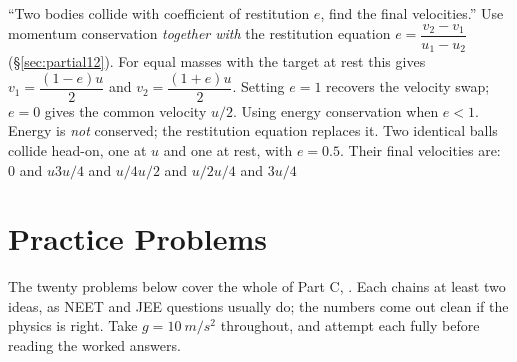 {``Two bodies collide with coefficient of restitution $e$, find the final velocities.''}
{Use momentum conservation \emph{together with} the restitution equation
$e=\dfrac{v_2-v_1}{u_1-u_2}$ (\S\ref{sec:partial12}). For equal masses with the target at rest this gives
$v_1=\dfrac{(1-e)u}{2}$ and $v_2=\dfrac{(1+e)u}{2}$. Setting $e=1$ recovers the velocity swap;
$e=0$ gives the common velocity $u/2$.}
{Using energy conservation when $e<1$. Energy is \emph{not} conserved; the restitution equation
replaces it.}
{Two identical balls collide head-on, one at $u$ and one at rest, with $e=0.5$. Their final velocities
are:}
{$0$ and $u$}{$3u/4$ and $u/4$}{$u/2$ and $u/2$}{$u/4$ and $3u/4$}


\section{Practice Problems}\label{sec:practice12}

The twenty problems below cover the whole of Part C, . Each chains at
least two ideas, as NEET and JEE questions usually do; the numbers come out clean if the physics is
right. Take $g=\SI{10}{m/s^2}$ throughout, and attempt each fully before reading the worked answers.

